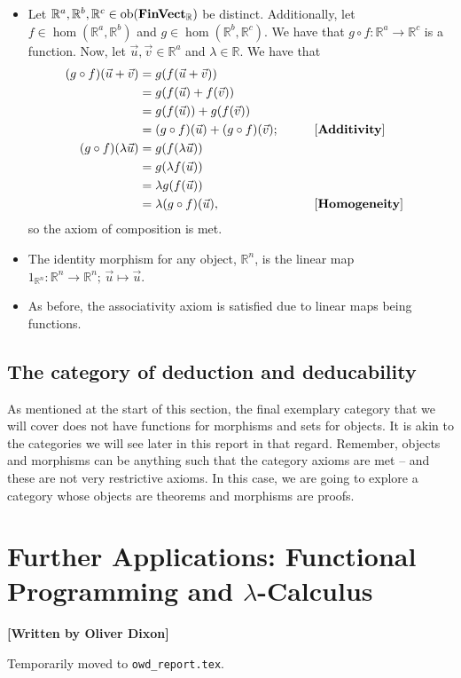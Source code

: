 \documentclass[10pt,a4paper,reqno]{amsart}
\numberwithin{figure}{section}
\begin{document}
\begin{itemize}
        \item Let $\mathbb{R} ^a, \mathbb{R} ^b, \mathbb{R} ^c \in
                \operatorname{ob} ( \operatorname{\mathbf{FinVect}_\mathbb{R}} )$ be distinct. Additionally, let \\
                $f \in \hom ( \mathbb{R} ^a, \mathbb{R} ^b)$ and
                $g \in \hom ( \mathbb{R} ^b, \mathbb{R} ^c)$.
                We have that $g \circ f \colon \mathbb{R} ^a \to \mathbb{R} ^c$
                is a function. Now, let $\vec{u} , \vec{v} \in \mathbb{R} ^a$
                and $\lambda \in \mathbb{R}$. We have that
                \begin{alignat*}{8}
                        (g \circ f)( \vec{u} + \vec{v} )
                        &= g(f( \vec{u} + \vec{v} )) \\
                        &= g(f( \vec{u} ) + f( \vec{v} )) \\
                        &= g(f( \vec{u} )) + g(f( \vec{v} )) \\
                        &= (g \circ f)( \vec{u} ) + (g \circ f)( \vec{v} );
                        \qquad && \text{[\textbf{Additivity}]} \\
                        (g \circ f)( \lambda \vec{u} )
                        &= g(f( \lambda \vec{u} )) \\
                        &= g( \lambda f( \vec{u} )) \\
                        &= \lambda g(f( \vec{u} )) \\
                        &= \lambda (g \circ f)( \vec{u} ),
                        \qquad && \text{[\textbf{Homogeneity}]}
                \end{alignat*}
                so the axiom of composition is met.
        \item The identity morphism for any object, $\mathbb{R} ^n$, is the linear map
                $1_{ \mathbb{R} ^n } \colon \mathbb{R} ^n \to \mathbb{R} ^n ; \,
                \vec{u} \mapsto \vec{u}$.
        \item As before, the associativity axiom is satisfied due to linear maps
                being functions.
\end{itemize}

\subsection{The category of deduction and deducability}
As mentioned at the start of this section, the final exemplary category that we
will cover does not have functions for morphisms and sets for objects. It is
akin to the categories we will see later in this report in that regard.
Remember, objects and morphisms can be anything such that the category axioms
are met -- and these are not very restrictive axioms.
In this case, we are going to explore a category whose objects are theorems and
morphisms are proofs.


\section{Further Applications: %
        Functional Programming and \texorpdfstring{$\lambda$}{Lambda}-Calculus}
\begin{flushright}
        \textbf{[Written by Oliver Dixon]}
\end{flushright}

\noindent Temporarily moved to \texttt{owd\_report.tex}.
\end{document}
